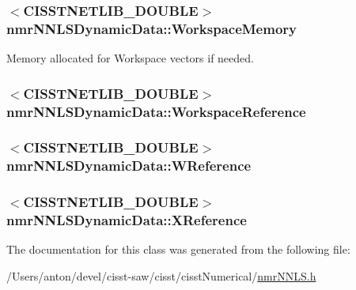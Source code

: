 \subsubsection[{Workspace\+Memory}]{$<$C\+I\+S\+S\+T\+N\+E\+T\+L\+I\+B\+\_\+\+D\+O\+U\+B\+L\+E$>$ nmr\+N\+N\+L\+S\+Dynamic\+Data\+::\+Workspace\+Memory\hspace{0.3cm}{\ttfamily [protected]}}\label{classnmr_n_n_l_s_dynamic_data_ac03cc6fe1d222824ec55376cd45e74bb}
Memory allocated for Workspace vectors if needed. \hypertarget{classnmr_n_n_l_s_dynamic_data_a1fb3e39d83099e79b997175d044f2115}{}
\subsubsection[{Workspace\+Reference}]{$<$C\+I\+S\+S\+T\+N\+E\+T\+L\+I\+B\+\_\+\+D\+O\+U\+B\+L\+E$>$ nmr\+N\+N\+L\+S\+Dynamic\+Data\+::\+Workspace\+Reference\hspace{0.3cm}{\ttfamily [protected]}}\label{classnmr_n_n_l_s_dynamic_data_a1fb3e39d83099e79b997175d044f2115}
\hypertarget{classnmr_n_n_l_s_dynamic_data_a0ba32ad64499bf28a292b08d49ee3210}{}
\subsubsection[{W\+Reference}]{$<$C\+I\+S\+S\+T\+N\+E\+T\+L\+I\+B\+\_\+\+D\+O\+U\+B\+L\+E$>$ nmr\+N\+N\+L\+S\+Dynamic\+Data\+::\+W\+Reference\hspace{0.3cm}{\ttfamily [protected]}}\label{classnmr_n_n_l_s_dynamic_data_a0ba32ad64499bf28a292b08d49ee3210}
\hypertarget{classnmr_n_n_l_s_dynamic_data_a84ad800513b0b1b9a910aeac150742d5}{}
\subsubsection[{X\+Reference}]{$<$C\+I\+S\+S\+T\+N\+E\+T\+L\+I\+B\+\_\+\+D\+O\+U\+B\+L\+E$>$ nmr\+N\+N\+L\+S\+Dynamic\+Data\+::\+X\+Reference\hspace{0.3cm}{\ttfamily [protected]}}\label{classnmr_n_n_l_s_dynamic_data_a84ad800513b0b1b9a910aeac150742d5}


The documentation for this class was generated from the following file\+:\begin{DoxyCompactItemize}
\item 
/\+Users/anton/devel/cisst-\/saw/cisst/cisst\+Numerical/\hyperlink{nmr_n_n_l_s_8h}{nmr\+N\+N\+L\+S.\+h}\end{DoxyCompactItemize}
